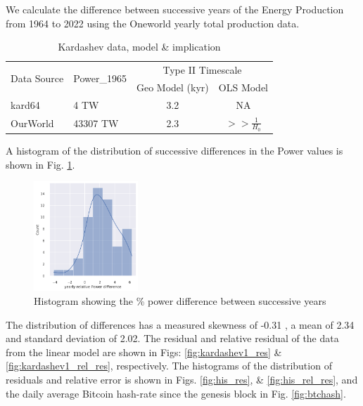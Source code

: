 \documentclass[final,5p,times,twocolumn,authoryear]{elsarticle}
\begin{document}
We calculate the difference between successive years of the Energy Production from 1964 to 2022 using the Oneworld yearly total production data. 


\begin{table}[h]
\centering
\caption{Kardashev data, model \& implication}
\label{kard_comp}
\begin{tabular}{|l|l|c|c|}
\hline
\multirow{2}{*}{Data Source} & \multirow{2}{*}{\textrm{Power_{1965}}} & \multicolumn{2}{c|}{Type II Timescale} \\
\cline{3-4}
                             &                       & Geo Model (kyr) & OLS Model         \\
\hline
kard64 \cite{kar64} & 4 TW                & 3.2             & NA          \\
\hline
OurWorld \cite{owidenergy}    & 43307 TW               & 2.3             & $>> \frac{1}{H_{0}}$     \\
\hline
\end{tabular}
\end{table}


A histogram of the distribution of successive differences in the Power values is shown in Fig. \ref{fig:his_power}. 

\begin{figure}
    \centering
    \includegraphics[width=0.35\textwidth]{figs/pp_his_kdetrue.png}
    \vspace*{-0.3cm}
    \caption{Histogram showing the \% power difference between successive years}
    \label{fig:his_power}
\end{figure}

The distribution of differences has a measured skewness of -0.31 \cite{zw00}, a mean of 2.34 and standard deviation of 2.02. The residual and relative residual of the data from the linear model are shown in Figs: \ref{fig:kardashev1_res} \& \ref{fig:kardashev1_rel_res}, respectively. The histograms of the distribution of residuals and relative error is shown in Figs. \ref{fig:his_res}, \& \ref{fig:his_rel_res}, and the daily average Bitcoin hash-rate since the genesis block in Fig. \ref{fig:btchash}.
\end{document}
